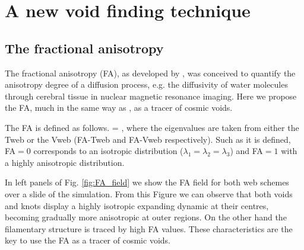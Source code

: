 \documentclass[a4,useAMS,usenatbib,usegraphicx]{latex/mn2e}
\begin{document}
\section{A new void finding technique}
\label{sec:bulk_voids}


\subsection{The fractional anisotropy}
\label{subsec:FA_voids}


The fractional anisotropy (FA), as developed by \citet{Basser95}, was 
conceived to quantify the anisotropy degree of a diffusion process, e.g. 
the diffusivity of water molecules through cerebral tissue in nuclear
magnetic resonance imaging. 
Here we propose the FA, much in the same way as \citet{Libeskind13},
as a tracer of cosmic voids. 


The FA is defined as follows.
{{} = ,}
where the eigenvalues are taken from either the Tweb or the Vweb 
(FA-Tweb and FA-Vweb respectively). Such as it is defined, FA$=0$ 
corresponds to an isotropic distribution ($\lambda_1=\lambda_2=\lambda_3$) and FA$=1$ with a highly anisotropic 
distribution.


In left panels of Fig. \ref{fig:FA_field} we show the FA field for both 
web schemes over a slide of the simulation. 
From this Figure we can observe that both voids and knots display a highly isotropic
expanding dynamic at their centres, becoming gradually more
anisotropic at outer regions. 
On the other hand the filamentary structure is traced by high FA
values. These characteristics are the key to use the FA as a tracer of
cosmic voids. 
\end{document}
